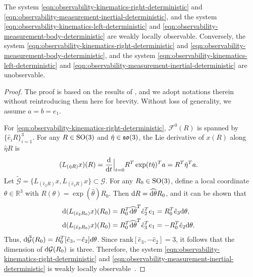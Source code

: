 \begin{theorem}
	The system \eqref{eqn:observability-kinematics-right-deterministic} and \eqref{eqn:observability-measurement-inertial-deterministic}, and the system \eqref{eqn:observability-kinematics-left-deterministic} and \eqref{eqn:observability-measurement-body-deterministic} are weakly locally observable.
	Conversely, the system \eqref{eqn:observability-kinematics-right-deterministic} and \eqref{eqn:observability-measurement-body-deterministic}, and the system \eqref{eqn:observability-kinematics-left-deterministic} and \eqref{eqn:observability-measurement-inertial-deterministic} are unobservable.
\end{theorem}
\begin{proof}
	The proof is based on the results of \cite{hermann1977nonlinear}, and we adopt notations therein without reintroducing them here for brevity.
	Without loss of generality, we assume $a = b = e_1$.

	For \eqref{eqn:observability-kinematics-right-deterministic}, $\mathcal{F}^0(R)$ is spanned by $\{\hat e_i R\}_{i=1}^3$.
	For any $R\in\mathrm{SO}(3)$ and $\hat{\eta}\in\mathfrak{so}(3)$, the Lie derivative of $x(R)$ along $\hat{\eta}R$ is
	\begin{align*}
		(L_{(\hat{\eta}R)}x)(R) = \frac{\mathrm{d}}{\mathrm{d} t} \Big\lvert_{t=0} 	R^T\exp(t\hat{\eta})^Ta = R^T\hat{\eta}^Ta.
	\end{align*}
	Let $\tilde{\mathcal{G}} = \{L_{(\hat{e}_2R)}x, L_{(\hat{e}_3R)}x\} \subset \mathcal{G}$.
	For any $R_0\in\mathrm{SO}(3)$, define a local coordinate $\theta\in\mathbb{R}^3$ with $R(\theta) = \exp(\hat\theta)R_0$.
	Then $\mathrm{d} R = \widehat{\mathrm{d} \theta}R_0$, and it can be shown that
	\begin{align*}
		\mathrm{d}(L_{(\hat{e}_2R_0)}x)(R_0) &= R_0^T \widehat{\mathrm{d}\theta}^T \hat e_2^T e_1 = R_0^T \hat e_3 \mathrm{d}\theta, \\
		\mathrm{d}(L_{(\hat{e}_3R_0)}x)(R_0) &= R_0^T \widehat{\mathrm{d}\theta}^T \hat e_3^T e_1  =-R_0^T \hat e_2 \mathrm{d}\theta.
	\end{align*}
	Thus, $\mathrm{d} \tilde{\mathcal{G}}(R_0) = R_0^T [\hat e_3, -\hat e_2]d\theta$.
	Since $\mathrm{rank}[\hat e_3,-\hat e_2]=3$, it follows that the dimension of $\mathrm{d}\mathcal{G}(R_0)$ is three.
	Therefore, the system \eqref{eqn:observability-kinematics-right-deterministic} and \eqref{eqn:observability-measurement-inertial-deterministic} is weakly locally observable~\cite[Theorem 3.2]{hermann1977nonlinear}.


\end{proof}
